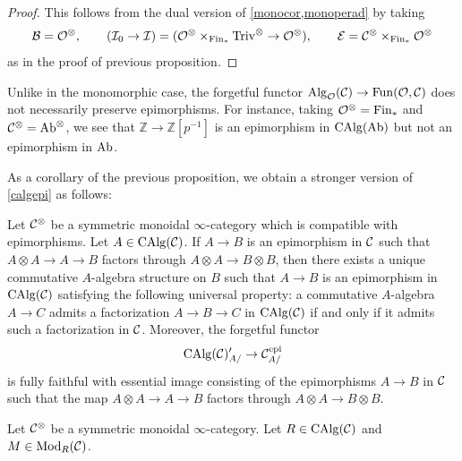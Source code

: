 \documentclass[10pt,a4paper,oneside]{article}
\begin{document}
\begin{proof}
This follows from the dual version of \cref{monocor,monoperad} by taking
\[
\mathcal{B}=\mathcal{O}^\otimes,\qquad 
(\mathcal{I}_0\to\mathcal{I})=
(\mathcal{O}^\otimes\times_{\operatorname{Fin}_*}\operatorname{Triv}^\otimes\to \mathcal{O}^\otimes),
\qquad
\mathcal{E}=\mathcal{C}^\otimes\times_{\operatorname{Fin}_*}\mathcal{O}^\otimes
\]
as in the proof of previous proposition.
\end{proof}

\begin{rem}
Unlike in the monomorphic case, the forgetful functor $\operatorname{Alg}_{\mathcal{O}}(\mathcal{C})\to \operatorname{Fun}(\mathcal{O},\mathcal{C})$ does not necessarily preserve epimorphisms. For instance, taking $\mathcal{O}^\otimes=\operatorname{Fin}_*$ and $\mathcal{C}^\otimes=\operatorname{Ab}^\otimes$, we see that $\mathbb{Z}\to \mathbb{Z}[p^{-1}]$ is an epimorphism in $\operatorname{CAlg}(\operatorname{Ab})$ but not an epimorphism in $\operatorname{Ab}$.
\end{rem}

As a corollary of the previous proposition, we obtain a stronger version of \cref{calgepi} as follows:
\begin{cor}\label{calgepi2}
Let $\mathcal{C}^\otimes$ be a symmetric monoidal $\infty$-category which is compatible with epimorphisms. Let $A \in \operatorname{CAlg}(\mathcal{C})$. If $A\xrightarrow{} B$ is an epimorphism in $\mathcal{C}$ such that $A\otimes A\xrightarrow{} A\to B$ factors through $A\otimes A\to B\otimes B$, then there exists a unique commutative $A$-algebra structure on $B$ such that $A\to B$ is an epimorphism in $\operatorname{CAlg}(\mathcal{C})$ satisfying the following universal property: a commutative $A$-algebra $A\to C$ admits a factorization $A\to B\to C$ in $\operatorname{CAlg}(\mathcal{C})$ if and only if it admits such a factorization in $\mathcal{C}$. Moreover, the forgetful functor $$\operatorname{CAlg}(\mathcal{C})_{A/}^{\prime}\to \mathcal{C}_{A/}^{\operatorname{epi}}$$ is fully faithful with essential image consisting of the epimorphisms $ A\to B$ in $\mathcal{C}$ such that the map $A\otimes A \to A\to B$ factors through $A\otimes A\to B\otimes B$.
\end{cor}

\begin{prop}\label{modumono}
Let $\mathcal{C}^\otimes$ be a symmetric monoidal $\infty$-category. Let $R\in\operatorname{CAlg}(\mathcal{C})$ and $M\in\operatorname{Mod}_R(\mathcal{C})$. 
\end{prop}
\end{document}
